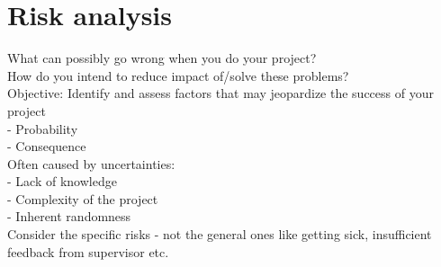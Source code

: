 \chapter{Risk analysis}
\label{chapter:7}

What can possibly go wrong when you do your project? \\
How do you intend to reduce impact of/solve these problems? \\
Objective: Identify and assess factors that may jeopardize the success of your project \\
- Probability \\
- Consequence \\
Often caused by uncertainties: \\
- Lack of knowledge \\
- Complexity of the project \\
- Inherent randomness \\
Consider the specific risks - not the general ones like getting sick, insufficient feedback from supervisor etc.